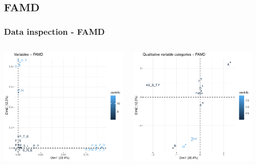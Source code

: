 \documentclass[compress]{beamer}
\begin{document}
\subsection{FAMD}
\begin{frame}
\frametitle{Data inspection - FAMD}
\begin{columns}
\begin{center}
\includegraphics[width=\linewidth]{Pic/FAMD_squared_loadings.pdf}
\end{center}
\begin{center}
\includegraphics[width=0.7\linewidth]{Pic/FAMD_Qualitative_VAR.pdf}

\end{center}
\end{columns}
\end{frame}
\end{document}
